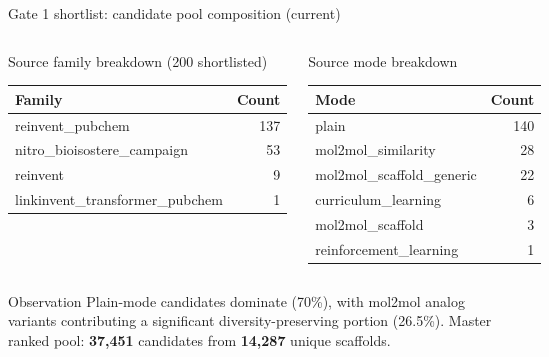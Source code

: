 \documentclass[aspectratio=169,10pt]{beamer}
\begin{document}
  \begin{frame}{Gate 1 shortlist: candidate pool composition (current)}
    \small
    \begin{columns}[T]
        \begin{block}{Source family breakdown (200 shortlisted)}
          \begin{tabularx}{\textwidth}{lr}
            \toprule
            \textbf{Family} & \textbf{Count} \\
            \midrule
            reinvent\_pubchem & 137 \\
            nitro\_bioisostere\_campaign & 53 \\
            reinvent & 9 \\
            linkinvent\_transformer\_pubchem & 1 \\
            \bottomrule
          \end{tabularx}
        \end{block}
        \begin{block}{Source mode breakdown}
          \begin{tabularx}{\textwidth}{lr}
            \toprule
            \textbf{Mode} & \textbf{Count} \\
            \midrule
            plain & 140 \\
            mol2mol\_similarity & 28 \\
            mol2mol\_scaffold\_generic & 22 \\
            curriculum\_learning & 6 \\
            mol2mol\_scaffold & 3 \\
            reinforcement\_learning & 1 \\
            \bottomrule
          \end{tabularx}
        \end{block}
    \end{columns}
    \vspace{3pt}
    \begin{exampleblock}{Observation}
      Plain-mode candidates dominate (70\%), with mol2mol analog variants
      contributing a significant diversity-preserving portion (26.5\%).
      Master ranked pool: \textbf{37,451} candidates from \textbf{14,287} unique scaffolds.
    \end{exampleblock}
  \end{frame}

\end{document}
